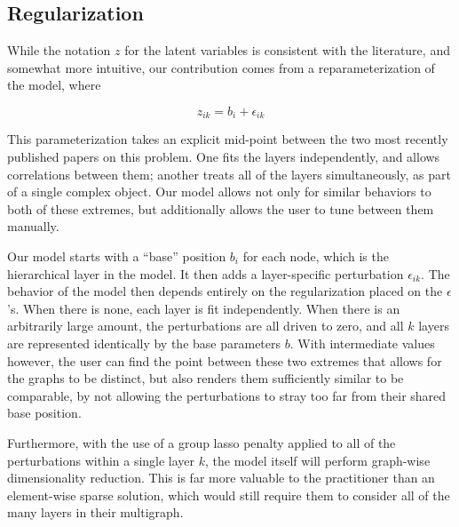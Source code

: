 \documentclass{article}
\begin{document}
\subsection{Regularization}

While the notation $z$ for the latent variables is consistent with the literature, and somewhat more intuitive, our contribution comes from a reparameterization of the model, where

\[
z_{ik} = b_i + \epsilon_{ik}
\]

This parameterization takes an explicit mid-point between the two most recently published papers on this problem. One \cite{salter-townsend} fits the layers independently, and allows correlations between them; another \cite{} treats all of the layers simultaneously, as part of a single complex object. Our model allows not only for similar behaviors to both of these extremes, but additionally allows the user to tune between them manually.

Our model starts with a ``base'' position $b_i$ for each node, which is the hierarchical layer in the model. It then adds a layer-specific perturbation $\epsilon_{ik}$. The behavior of the model then depends entirely on the regularization placed on the $\epsilon$'s. When there is none, each layer is fit independently. When there is an arbitrarily large amount, the perturbations are all driven to zero, and all $k$ layers are represented identically by the base parameters $b$. With intermediate values however, the user can find the point between these two extremes that allows for the graphs to be distinct, but also renders them sufficiently similar to be comparable, by not allowing the perturbations to stray too far from their shared base position.

Furthermore, with the use of a group lasso penalty applied to all of the perturbations within a single layer $k$, the model itself will perform graph-wise dimensionality reduction. This is far more valuable to the practitioner than an element-wise sparse solution, which would still require them to consider all of the many layers in their multigraph. %


\end{document}
